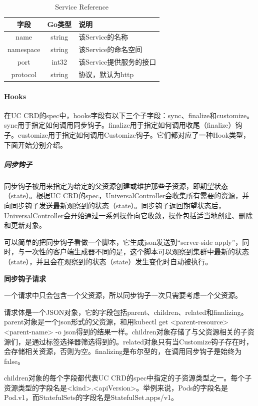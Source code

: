 \documentclass[macfonts,master]{njuthesis}
\begin{document}
\begin{table}
  \centering
  \begin{tabular}{ccp{50mm}}
    \toprule
    \textbf{字段} & \textbf{Go类型} & \textbf{说明} \\
    \midrule
    name  & string  & 该Service的名称\\
    namespace  & string   &  该Service的命名空间 \\
    port     & int32  & 该Service提供服务的接口 \\
    protocol    & string   &  协议，默认为http \\
    \bottomrule
  \end{tabular}
  \caption{Service Reference}\label{table:service-reference}
\end{table}

\paragraph{Hooks}
在UC CRD的spec中，hooks字段有以下三个子字段：sync、finalize和customize。sync用于指定如何调用同步钩子。finalize用于指定如何调用收尾（finalize）钩子。customize用于指定如何调用Customize钩子。它们都对应了一种Hook类型，下面开始分别介绍。

\subparagraph{同步钩子}

同步钩子被用来指定为给定的父资源创建或维护那些子资源，即期望状态（state）。根据UC CRD的spec，UniversalController会收集所有需要的资源，并向同步钩子发送最新观察到的状态（state）。同步钩子返回期望状态后，UniversalController会开始通过一系列操作向它收敛，操作包括适当地创建、删除和更新对象。

可以简单的把同步钩子看做一个脚本，它生成json发送到``server-side apply''，同时，与一次性的客户端生成器不同的是，这个脚本可以观察到集群中最新的状态（state），并且会在观察到的状态（state）发生变化时自动被执行。

\textbf{同步钩子请求}

一个请求中只会包含一个父资源，所以同步钩子一次只需要考虑一个父资源。

请求体是一个JSON对象，它的字段包括parent、children、related和finalizing。parent对象是一个json形式的父资源，和用kubectl get <parent-resource> <parent-name> -o json得到的结果一样。children对象存储了与父资源相关的子资源们，是通过标签选择器筛选得到的。related对象只有当Customize钩子存在时，会存储相关资源，否则为空。finalizing是布尔型的，在调用同步钩子是始终为false。

children对象的每个字段都代表UC CRD的spec中指定的子资源类型之一。每个子资源类型的字段名是<kind>.<apiVersion>。举例来说，Pods的字段名是Pod.v1，而StatefulSets的字段名是StatefulSet.apps/v1。
\end{document}
